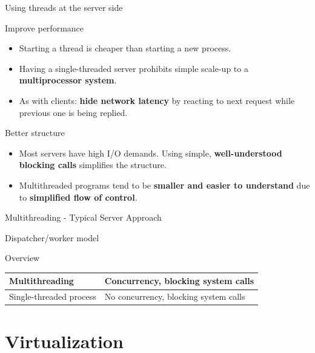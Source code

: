 \begin{frame}{Using threads at the server side}
  \begin{block}{Improve performance}
    \begin{itemize}\tightlist
      \item Starting a thread is cheaper than starting a new process.
      \item Having a single-threaded server prohibits simple scale-up to a \textbf{multiprocessor system}.
      \item As with clients: \textbf{hide network latency} by reacting to next request while previous one is being replied.
    \end{itemize}
  \end{block}
  \begin{block}{Better structure}
    \begin{itemize}\tightlist
      \item Most servers have high I/O demands. Using simple, \textbf{well-understood blocking calls} simplifies
            the structure.
      \item Multithreaded programs tend to be \textbf{smaller and easier to understand} due to \textbf{simplified
              flow of control}.
    \end{itemize}
  \end{block}
\end{frame}
\begin{frame}{Multithreading - Typical Server Approach}
  \begin{block}{Dispatcher/worker model}
    \begin{center}
    \end{center}
  \end{block}
  \begin{block}{Overview}
    \begin{center}
      \begin{tabular}{|l|l|}\hline
        Multithreading          & Concurrency, blocking system calls    \\ \hline
        Single-threaded process & No concurrency, blocking system calls \\ \hline
      \end{tabular}
    \end{center}
  \end{block}
\end{frame}

\section{Virtualization}
